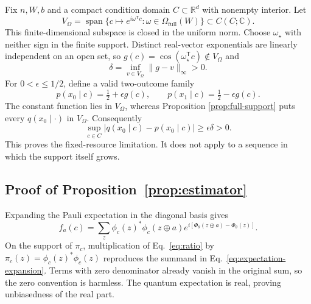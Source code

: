 Fix $n,W,b$ and a compact condition domain $C\subset\mathbb R^d$ with nonempty
interior.  Let
\begin{equation}
 V_\Omega=\operatorname{span}\{c\mapsto e^{i\omega^\mathsf{T}c}:
 \omega\in\Omega_{\mathrm{full}}(W)\}\subset C(C;\mathbb C).
\end{equation}
This finite-dimensional subspace is closed in the uniform norm.  Choose
$\omega_\star$ with neither sign in the finite support.  Distinct real-vector
exponentials are linearly independent on an open set, so
$g(c)=\cos(\omega_\star^\mathsf{T}c)\notin V_\Omega$ and
\begin{equation}
 \delta=\inf_{v\in V_\Omega}\|g-v\|_\infty>0.
\end{equation}
For $0<\epsilon\leq1/2$, define a valid two-outcome family
\begin{equation}
 p(x_0\mid c)=\tfrac12+\epsilon g(c),\qquad
 p(x_1\mid c)=\tfrac12-\epsilon g(c).
\end{equation}
The constant function lies in $V_\Omega$, whereas Proposition
\ref{prop:full-support} puts every $q(x_0\mid\cdot)$ in $V_\Omega$.
Consequently
\begin{equation}
 \sup_{c\in C}|q(x_0\mid c)-p(x_0\mid c)|\geq\epsilon\delta>0.
\end{equation}
This proves the fixed-resource limitation.  It does not apply to a sequence in
which the support itself grows.

\subsection{Proof of Proposition~\ref{prop:estimator}}

Expanding the Pauli expectation in the diagonal basis gives
\begin{equation}
 f_a(c)=\sum_z\phi_c(z)^*\phi_c(z\oplus a)
 e^{i[\Phi_\theta(z\oplus a)-\Phi_\theta(z)]}.
 \label{eq:expectation-expansion}
\end{equation}
On the support of $\pi_c$, multiplication of Eq.~\eqref{eq:ratio} by
$\pi_c(z)=\phi_c(z)^*\phi_c(z)$ reproduces the summand in
Eq.~\eqref{eq:expectation-expansion}.  Terms with zero denominator already
vanish in the original sum, so the zero convention is harmless.  The quantum
expectation is real, proving unbiasedness of the real part.

